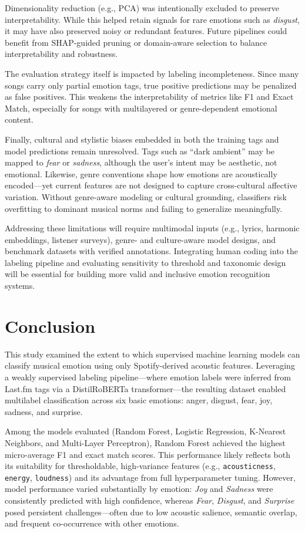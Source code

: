 \documentclass{article}
\begin{document}
Dimensionality reduction (e.g., PCA) was intentionally excluded to preserve interpretability. While this helped retain signals for rare emotions such as \textit{disgust}, it may have also preserved noisy or redundant features. Future pipelines could benefit from SHAP-guided pruning or domain-aware selection to balance interpretability and robustness.

The evaluation strategy itself is impacted by labeling incompleteness. Since many songs carry only partial emotion tags, true positive predictions may be penalized as false positives. This weakens the interpretability of metrics like F1 and Exact Match, especially for songs with multilayered or genre-dependent emotional content.

Finally, cultural and stylistic biases embedded in both the training tags and model predictions remain unresolved. Tags such as “dark ambient” may be mapped to \textit{fear} or \textit{sadness}, although the user’s intent may be aesthetic, not emotional. Likewise, genre conventions shape how emotions are acoustically encoded—yet current features are not designed to capture cross-cultural affective variation. Without genre-aware modeling or cultural grounding, classifiers risk overfitting to dominant musical norms and failing to generalize meaningfully.

Addressing these limitations will require multimodal inputs (e.g., lyrics, harmonic embeddings, listener surveys), genre- and culture-aware model designs, and benchmark datasets with verified annotations. Integrating human coding into the labeling pipeline and evaluating sensitivity to threshold and taxonomic design will be essential for building more valid and inclusive emotion recognition systems.

\section{Conclusion}

This study examined the extent to which supervised machine learning models can classify musical emotion using only Spotify-derived acoustic features. Leveraging a weakly supervised labeling pipeline—where emotion labels were inferred from Last.fm tags via a DistilRoBERTa transformer—the resulting dataset enabled multilabel classification across six basic emotions: anger, disgust, fear, joy, sadness, and surprise.

Among the models evaluated (Random Forest, Logistic Regression, K-Nearest Neighbors, and Multi-Layer Perceptron), Random Forest achieved the highest micro-average F1 and exact match scores. This performance likely reflects both its suitability for thresholdable, high-variance features (e.g., \texttt{acousticness}, \texttt{energy}, \texttt{loudness}) and its advantage from full hyperparameter tuning. However, model performance varied substantially by emotion: \textit{Joy} and \textit{Sadness} were consistently predicted with high confidence, whereas \textit{Fear}, \textit{Disgust}, and \textit{Surprise} posed persistent challenges—often due to low acoustic salience, semantic overlap, and frequent co-occurrence with other emotions.
\end{document}
